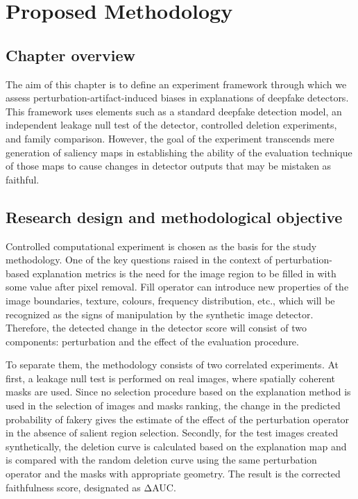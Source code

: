 \chapter{Proposed Methodology}
\label{ch:methodology}


\section{\texorpdfstring{\textbf{Chapter
overview}}{Chapter overview}}\label{chapter-overview}

The aim of this chapter is to define an experiment framework through
which we assess perturbation-artifact-induced biases in explanations of
deepfake detectors. This framework uses elements such as a standard
deepfake detection model, an independent leakage null test of the
detector, controlled deletion experiments, and family comparison.
However, the goal of the experiment transcends mere generation of
saliency maps in establishing the ability of the evaluation technique of
those maps to cause changes in detector outputs that may be mistaken as
faithful.

\section{\texorpdfstring{\textbf{Research design and methodological
objective}}{Research design and methodological objective}}\label{research-design-and-methodological-objective}

Controlled computational experiment is chosen as the basis for the study
methodology. One of the key questions raised in the context of
perturbation-based explanation metrics is the need for the image region
to be filled in with some value after pixel removal. Fill operator can
introduce new properties of the image boundaries, texture, colours,
frequency distribution, etc., which will be recognized as the signs of
manipulation by the synthetic image detector. Therefore, the detected
change in the detector score will consist of two components:
perturbation and the effect of the evaluation procedure.

To separate them, the methodology consists of two correlated
experiments. At first, a leakage null test is performed on real images,
where spatially coherent masks are used. Since no selection procedure
based on the explanation method is used in the selection of images and
masks ranking, the change in the predicted probability of fakery gives
the estimate of the effect of the perturbation operator in the absence
of salient region selection. Secondly, for the test images created
synthetically, the deletion curve is calculated based on the explanation
map and is compared with the random deletion curve using the same
perturbation operator and the masks with appropriate geometry. The
result is the corrected faithfulness score, designated as ΔAUC.


